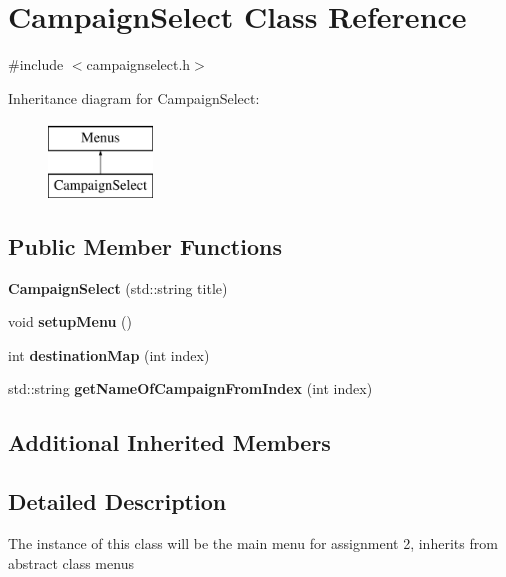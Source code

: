 \hypertarget{class_campaign_select}{}\section{Campaign\+Select Class Reference}
\label{class_campaign_select}


{\ttfamily \#include $<$campaignselect.\+h$>$}

Inheritance diagram for Campaign\+Select\+:\begin{figure}[H]
\begin{center}
\leavevmode
\includegraphics[height=2.000000cm]{class_campaign_select}
\end{center}
\end{figure}
\subsection*{Public Member Functions}
\begin{DoxyCompactItemize}
\item 
\hypertarget{class_campaign_select_a92b7e9fe25873bb47e9099f50a1962a0}{}\label{class_campaign_select_a92b7e9fe25873bb47e9099f50a1962a0} 
{\bfseries Campaign\+Select} (std\+::string title)
\item 
\hypertarget{class_campaign_select_a6bd99e582bf7989dc0e2ab52808ee74a}{}\label{class_campaign_select_a6bd99e582bf7989dc0e2ab52808ee74a} 
void {\bfseries setup\+Menu} ()
\item 
\hypertarget{class_campaign_select_a530522e4d7e1ecc43bc5ff4e96c14d40}{}\label{class_campaign_select_a530522e4d7e1ecc43bc5ff4e96c14d40} 
int {\bfseries destination\+Map} (int index)
\item 
\hypertarget{class_campaign_select_a604ccab61deb7370acdb3d555e89ea1a}{}\label{class_campaign_select_a604ccab61deb7370acdb3d555e89ea1a} 
std\+::string {\bfseries get\+Name\+Of\+Campaign\+From\+Index} (int index)
\end{DoxyCompactItemize}
\subsection*{Additional Inherited Members}


\subsection{Detailed Description}
The instance of this class will be the main menu for assignment 2, inherits from abstract class menus 

